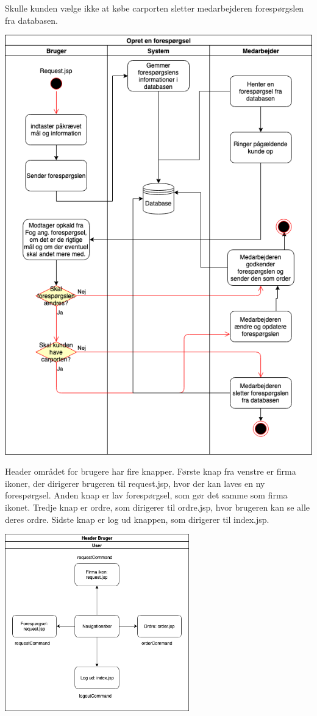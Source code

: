 \documentclass[11pt]{report}
\begin{document}
Skulle kunden vælge ikke at købe carporten sletter medarbejderen
forespørgslen fra databasen. \\
\begin{center}
\includegraphics[width=13.5cm]{Foresporgsel.png}
\end{center}
Header området for brugere har fire knapper. Første knap fra venstre
er firma ikoner, der dirigerer brugeren til request.jsp, hvor der kan
laves en ny forespørgsel. Anden knap er lav forespørgsel, som gør det
samme som firma ikonet. Tredje knap er ordre, som dirigerer til
ordre.jsp, hvor brugeren kan se alle deres ordre. Sidste knap er log
ud knappen, som dirigerer til index.jsp. \\
\begin{center}
\includegraphics[width=8cm]{HeaderBruger.png}
\end{center}
\end{document}
